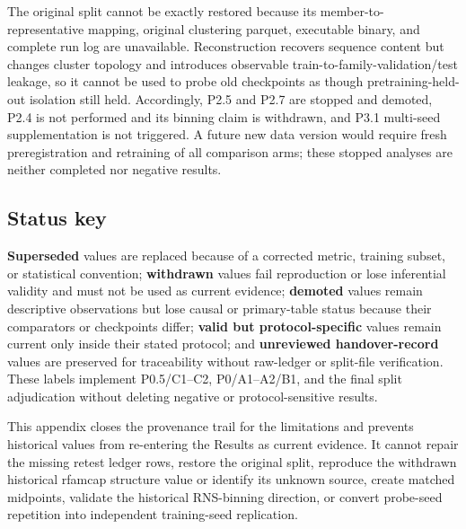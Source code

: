 The original split cannot be exactly restored because its member-to-representative mapping, original clustering parquet, executable binary, and complete run log are unavailable. Reconstruction recovers sequence content but changes cluster topology and introduces observable train-to-family-validation/test leakage, so it cannot be used to probe old checkpoints as though pretraining-held-out isolation still held. Accordingly, P2.5 and P2.7 are stopped and demoted, P2.4 is not performed and its binning claim is withdrawn, and P3.1 multi-seed supplementation is not triggered. A future new data version would require fresh preregistration and retraining of all comparison arms; these stopped analyses are neither completed nor negative results.

\hypertarget{a.7-status-key}{%
\subsection{Status key}\label{a.7-status-key}}

\textbf{Superseded} values are replaced because of a corrected metric, training subset, or statistical convention; \textbf{withdrawn} values fail reproduction or lose inferential validity and must not be used as current evidence; \textbf{demoted} values remain descriptive observations but lose causal or primary-table status because their comparators or checkpoints differ; \textbf{valid but protocol-specific} values remain current only inside their stated protocol; and \textbf{unreviewed handover-record} values are preserved for traceability without raw-ledger or split-file verification. These labels implement P0.5/C1--C2, P0/A1--A2/B1, and the final split adjudication without deleting negative or protocol-sensitive results.

This appendix closes the provenance trail for the limitations and prevents historical values from re-entering the Results as current evidence. It cannot repair the missing retest ledger rows, restore the original split, reproduce the withdrawn historical rfamcap structure value or identify its unknown source, create matched midpoints, validate the historical RNS-binning direction, or convert probe-seed repetition into independent training-seed replication.
